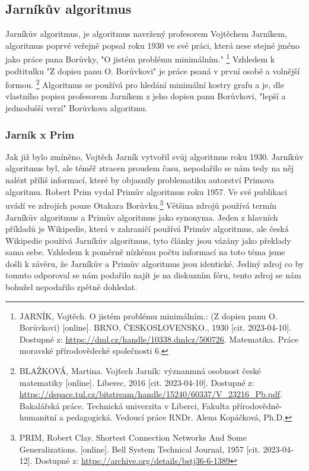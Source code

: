 \documentclass[11pt]{article}
\begin{document}
\subsection{Jarníkův algoritmus}
Jarníkův algoritmus, je algoritmus navržený profesorem Vojtěchem Jarníkem, algoritmus poprvé veřejně popsal roku 1930 ve své práci, která nese stejné jméno jako práce pana Borůvky, "O jistém problému minimálním."
\footnote{JARNÍK, Vojtěch. O jistém problému minimálním.: (Z dopisu panu O. Borůvkovi) [online]. BRNO, ČESKOSLOVENSKO., 1930 [cit. 2023-04-10]. Dostupné z: \url{https://dml.cz/handle/10338.dmlcz/500726}. Matematika. Práce moravské přírodovědecké společnosti 6.} Vzhledem k podtitulku "Z dopisu panu O. Borůvkovi" je práce psaná v první osobě a volnější formou.
\footnote{BLAŽKOVÁ, Martina. Vojťech Jarník: význanmná osobnost české matematiky [online]. Liberec, 2016 [cit. 2023-04-10]. Dostupné z: \url{https://dspace.tul.cz/bitstream/handle/15240/60337/V_23216_Pb.pdf}. Bakalářská práce. Technická univerzita v Liberci, Fakulta přírodovědně-humanitní a pedagogická. Vedoucí práce RNDr. Alena Kopáčková, Ph.D.} Algoritmus se používá pro hledání minimální kostry grafu a je, dle vlastního popisu profesorem Jarníkem z jeho dopisu panu Borůvkovi, "lepší a jednodušší verzí" Borůvkova algoritmu.

\subsubsection{Jarník x Prim}
Jak již bylo zmíněno, Vojtěch Jarník vytvořil svůj algoritmus roku 1930. Jarníkův algoritmus byl, ale téměř ztracen proudem času, nepodařilo se nám tedy na něj nalézt příliš informací, které by objasnily problematiku autorství Primova algoritmu. Robert Prim vydal Primův algoritmus roku 1957. Ve své publikaci uvádí ve zdrojích pouze Otakara Borůvku.\footnote{PRIM, Robert Clay. Shortest Connection Networks And Some Generalizations. [online]. Bell System Technical Journal, 1957 [cit. 2023-04-12]. Dostupné z: \url{https://archive.org/details/bstj36-6-1389}} Většina zdrojů používá termín Jarníkův algoritmus a Primův algoritmus jako synonyma. Jeden z hlavních příkladů je Wikipedie, která v zahraničí používá Primův algoritmus, ale česká Wikipedie používá Jarníkův algoritmus, tyto články jsou vázány jako překlady sama sebe. Vzhledem k poměrně nízkému počtu informací na toto téma jsme došli k závěru, že Jarníkův a Primův algoritmus jsou identické. Jediný zdroj co by tomuto odporoval se nám podařilo najít je na diskuzním fóru, tento zdroj se nám bohužel nepodařilo zpětně dohledat. 
\end{document}
